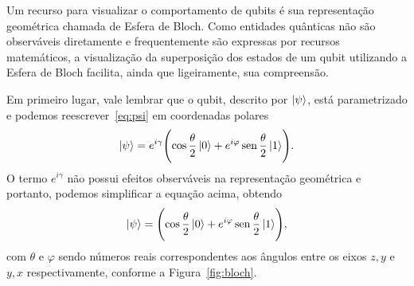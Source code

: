 Um recurso para visualizar o comportamento de qubits é sua representação geométrica chamada de Esfera de Bloch. Como entidades quânticas não são observáveis diretamente e frequentemente são expressas por recursos matemáticos, a visualização da superposição dos estados de um qubit utilizando a Esfera de Bloch facilita, ainda que ligeiramente, sua compreensão.

Em primeiro lugar, vale lembrar que o qubit, descrito por $\ket{\psi}$, está parametrizado e podemos reescrever~\eqref{eq:psi} em coordenadas polares
\begin{equation}
\ket{\psi}=e^{i \gamma}\Biggl(\cos \frac{\theta}{2}\ket{0}+e^{i \varphi} \operatorname{sen} \frac{\theta}{2}\ket{1}\Biggr).
\end{equation}
O termo \(e^{i\gamma}\) não possui efeitos observáveis na representação geométrica e portanto, podemos simplificar a equação acima, obtendo
\begin{equation}\label{eq:coordpolarpsi}
\ket{\psi}=\Biggl(\cos \frac{\theta}{2}\ket{0}+e^{i \varphi} \operatorname{sen} \frac{\theta}{2}\ket{1}\Biggr),
\end{equation}
com $\theta$ e $\varphi$ sendo números reais correspondentes aos ângulos entre os eixos $z, y$ e $y, x$ respectivamente, conforme a
Figura~\ref{fig:bloch}.

